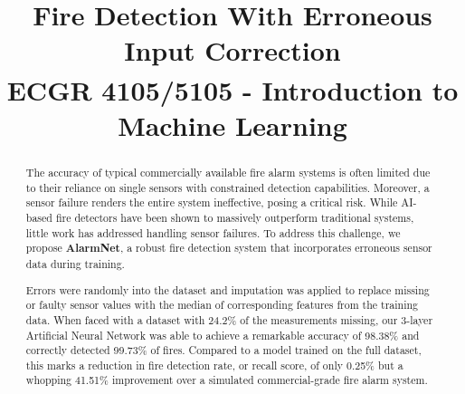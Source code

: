 \documentclass[conference]{IEEEtran}
\begin{document}
\title{Fire Detection With Erroneous Input Correction\\
{\footnotesize \textsuperscript{} ECGR 4105/5105 - Introduction to Machine Learning}
}

\author{
\and
{}
\and
{}
}
\maketitle

\begin{abstract}
The accuracy of typical commercially available fire alarm systems is often limited due to their reliance on single sensors with constrained detection capabilities. Moreover, a sensor failure renders the entire system ineffective, posing a critical risk. While AI-based fire detectors have been shown to massively outperform traditional systems, little work has addressed handling sensor failures.
To address this challenge, we propose \textbf{AlarmNet}, a robust fire detection system that incorporates erroneous sensor data during training. 

Errors were randomly into the dataset and imputation was applied to replace missing or faulty sensor values with the median of corresponding features from the training data. When faced with a dataset with 24.2\% of the measurements missing, our 3-layer Artificial Neural Network was able to achieve a remarkable accuracy of 98.38\% and correctly detected 99.73\% of fires. Compared to a model trained on the full dataset, this marks a reduction in fire detection rate, or recall score, of only 0.25\% but a whopping 41.51\% improvement over a simulated commercial-grade fire alarm system.

\end{abstract}
\end{document}
